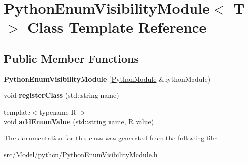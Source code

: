 \hypertarget{classPythonEnumVisibilityModule}{}\section{Python\+Enum\+Visibility\+Module$<$ T $>$ Class Template Reference}
\label{classPythonEnumVisibilityModule}
\subsection*{Public Member Functions}
\begin{DoxyCompactItemize}
\item 
{\bfseries Python\+Enum\+Visibility\+Module} (\hyperlink{classPythonModule}{Python\+Module} \&python\+Module)\hypertarget{classPythonEnumVisibilityModule_a8cb582c44897e0007f47d93bb788abb7}{}\label{classPythonEnumVisibilityModule_a8cb582c44897e0007f47d93bb788abb7}

\item 
void {\bfseries register\+Class} (std\+::string name)\hypertarget{classPythonEnumVisibilityModule_af32325e17606d532567e4443b6dd6d4f}{}\label{classPythonEnumVisibilityModule_af32325e17606d532567e4443b6dd6d4f}

\item 
{\footnotesize template$<$typename R $>$ }\\void {\bfseries add\+Enum\+Value} (std\+::string name, R value)\hypertarget{classPythonEnumVisibilityModule_a0bba4b5104e37d44aba6aca6e10ffb64}{}\label{classPythonEnumVisibilityModule_a0bba4b5104e37d44aba6aca6e10ffb64}

\end{DoxyCompactItemize}


The documentation for this class was generated from the following file\+:\begin{DoxyCompactItemize}
\item 
src/\+Model/python/Python\+Enum\+Visibility\+Module.\+h\end{DoxyCompactItemize}
